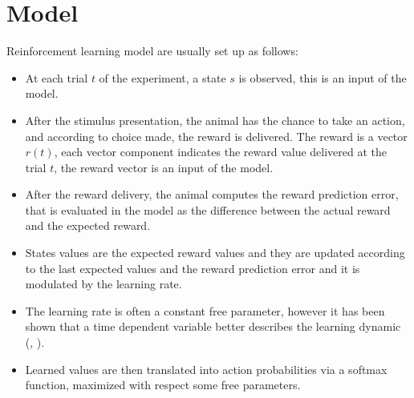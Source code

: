 \section{Model}
\label{sec:Model}
Reinforcement learning model are usually set up as follows:
\begin{itemize}
    \item At each trial $t$ of the experiment, a state $s$ is observed, this is an input of the model.
    \item After the stimulus presentation, the animal has the chance to take an action, and according to choice made, the reward is delivered. The reward is a vector $r(t)$, each vector component indicates the reward value delivered at the trial $t$, the reward vector is an input of the model.
    \item After the reward delivery, the animal computes the reward prediction error, that is evaluated in the model as the difference between the actual reward and the expected reward.
    \item States values are the expected reward values and they are updated according to the last expected values and the reward prediction error and it is modulated by the learning rate.
    \item The learning rate is often a constant free parameter, however it has been shown that a time dependent variable better describes the learning dynamic (\cite{Funamizu}, \cite{Daw}).
    \item Learned values are then translated into action probabilities via a softmax function, maximized with respect some free parameters.
\end{itemize}

